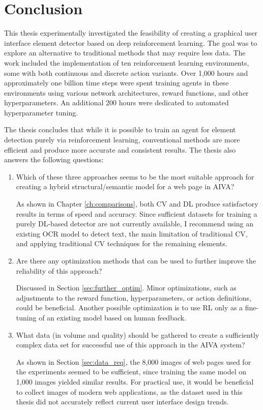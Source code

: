 \documentclass[
  digital,     %
  oneside,     %
  nosansbold,  %
  nocolorbold, %
  lof,         %
  lot,         %
]{fithesis4}
\begin{document}
\chapter*{Conclusion}
This thesis experimentally investigated the feasibility of creating a graphical user interface element detector based on deep reinforcement learning. The goal was to explore an alternative to traditional methods that may require less data. The work included the implementation of ten reinforcement learning environments, some with both continuous and discrete action variants. Over 1,000 hours and approximately one billion time steps were spent training agents in these environments using various network architectures, reward functions, and other hyperparameters. An additional 200 hours were dedicated to automated hyperparameter tuning.

The thesis concludes that while it is possible to train an agent for element detection purely via reinforcement learning, conventional methods are more efficient and produce more accurate and consistent results. The thesis also answers the following questions:

\begin{enumerate}
    \item Which of these three approaches seems to be the most suitable approach for creating a hybrid structural/semantic model for a web page in AIVA?

    As shown in Chapter \ref{ch:comparisons}, both CV and DL produce satisfactory results in terms of speed and accuracy. Since sufficient datasets for training a purely DL-based detector are not currently available, I recommend using an existing OCR model to detect text, the main limitation of traditional CV, and applying traditional CV techniques for the remaining elements.

    \item Are there any optimization methods that can be used to further improve the reliability of this approach?

    Discussed in Section \ref{sec:further_optim}. Minor optimizations, such as adjustments to the reward function, hyperparameters, or action definitions, could be beneficial. Another possible optimization is to use RL only as a fine-tuning of an existing model based on human feedback.

    \item What data (in volume and quality) should be gathered to create a sufficiently complex data set for successful use of this approach in the AIVA system?

    As shown in Section \ref{sec:data_req}, the 8,000 images of web pages used for the experiments seemed to be sufficient, since training the same model on 1,000 images yielded similar results. For practical use, it would be beneficial to collect images of modern web applications, as the dataset used in this thesis did not accurately reflect current user interface design trends.
\end{enumerate}
\end{document}
